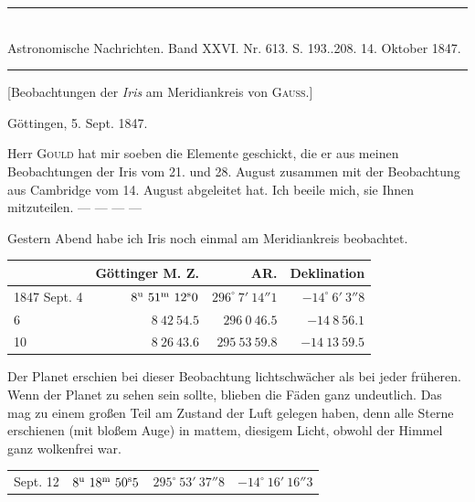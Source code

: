 \clearpage
\hypertarget{native-479-lower}{}
\begin{center}
\rule{0.55\linewidth}{0.4pt}\\[2pt]
Astronomische Nachrichten. Band XXVI. Nr. 613. S. 193..208. 14. Oktober 1847.\\[2pt]
\rule{0.55\linewidth}{0.4pt}
\end{center}
\begin{center}[Beobachtungen der \emph{Iris} am Meridiankreis von \textsc{Gauss}.]\end{center}
\begin{flushright}Göttingen, 5. Sept. 1847.\end{flushright}

Herr \textsc{Gould} hat mir soeben die Elemente geschickt, die er aus meinen Beobachtungen der Iris vom 21. und 28. August zusammen mit der Beobachtung aus Cambridge vom 14. August abgeleitet hat. Ich beeile mich, sie Ihnen mitzuteilen. --- --- --- ---

Gestern Abend habe ich Iris noch einmal am Meridiankreis beobachtet.

\begin{center}
\setlength{\tabcolsep}{4pt}
\begin{tabular}{l|r|r|r}
 & Göttinger M. Z. & AR. & Deklination \\\hline
1847 Sept. 4 & $8^{\rm u}\ 51^{\rm m}\ 12^{\rm s}0$ & $296^\circ\ 7'\ 14''1$ & $-14^\circ\ 6'\ 3''8$ \\
\hfill 6 & $8\ 42\ 54.5$ & $296\ 0\ 46.5$ & $-14\ 8\ 56.1$ \\
\hfill 10 & $8\ 26\ 43.6$ & $295\ 53\ 59.8$ & $-14\ 13\ 59.5$ \\
\end{tabular}
\end{center}

Der Planet erschien bei dieser Beobachtung lichtschwächer als bei jeder früheren. Wenn der Planet zu sehen sein sollte, blieben die Fäden ganz undeutlich. Das mag zu einem großen Teil am Zustand der Luft gelegen haben, denn alle Sterne erschienen (mit bloßem Auge) in mattem, diesigem Licht, obwohl der Himmel ganz wolkenfrei war.

\begin{center}
\begin{tabular}{l|r|r|r}
Sept. 12 & $8^{\rm u}\ 18^{\rm m}\ 50^{\rm s}5$ & $295^\circ\ 53'\ 37''8$ & $-14^\circ\ 16'\ 16''3$ \\
\end{tabular}
\end{center}

